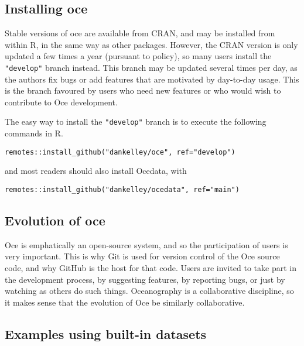 \documentclass[
]{article}
\begin{document}
\hypertarget{installing-oce}{%
\subsection{Installing oce}\label{installing-oce}}

Stable versions of oce are available from CRAN, and may be installed
from within R, in the same way as other packages. However, the CRAN
version is only updated a few times a year (pursuant to policy), so many
users install the \texttt{"develop"} branch instead. This branch may be
updated several times per day, as the authors fix bugs or add features
that are motivated by day-to-day usage. This is the branch favoured by
users who need new features or who would wish to contribute to Oce
development.

The easy way to install the \texttt{"develop"} branch is to execute the
following commands in R.

\begin{verbatim}
remotes::install_github("dankelley/oce", ref="develop")
\end{verbatim}

and most readers should also install Ocedata, with

\begin{verbatim}
remotes::install_github("dankelley/ocedata", ref="main")
\end{verbatim}

\hypertarget{evolution-of-oce}{%
\subsection{Evolution of oce}\label{evolution-of-oce}}

Oce is emphatically an open-source system, and so the participation of
users is very important. This is why Git is used for version control of
the Oce source code, and why GitHub is the host for that code. Users are
invited to take part in the development process, by suggesting features,
by reporting bugs, or just by watching as others do such things.
Oceanography is a collaborative discipline, so it makes sense that the
evolution of Oce be similarly collaborative.

\hypertarget{examples-using-built-in-datasets}{%
\subsection{Examples using built-in
datasets}\label{examples-using-built-in-datasets}}
\end{document}
